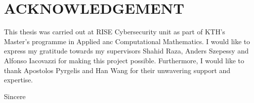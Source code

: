 \thispagestyle{empty}
\section*{ACKNOWLEDGEMENT}

This thesis was carried out at RISE Cybersecurity unit as part of KTH's Master's programme in Applied anc Computational Mathematics. I would like to express my gratitude towards my supervisors Shahid Raza, Anders Szepessy and Alfonso Iacovazzi for making this project possible. Furthermore, I would like to thank Apostolos Pyrgelis and Han Wang for their unwavering support and expertise.

Sincere
